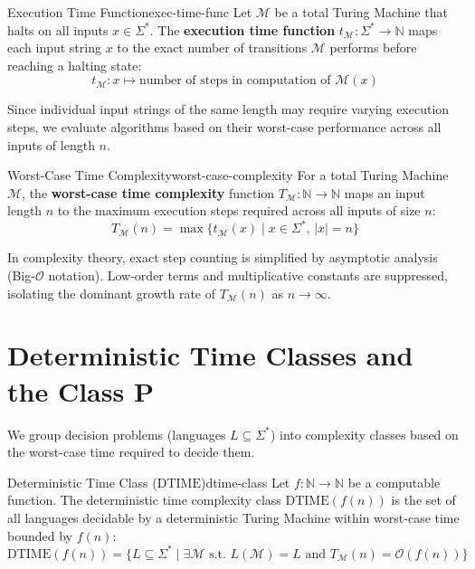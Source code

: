 \begin{definition}{Execution Time Function}{exec-time-func}
Let $\mathcal{M}$ be a total Turing Machine that halts on all inputs $x \in \Sigma^*$. The \textbf{execution time function} $t_{\mathcal{M}} : \Sigma^* \to \mathbb{N}$ maps each input string $x$ to the exact number of transitions $\mathcal{M}$ performs before reaching a halting state:
\[
t_{\mathcal{M}} : x \mapsto \text{number of steps in computation of } \mathcal{M}(x)
\]
\end{definition}

Since individual input strings of the same length may require varying execution steps, we evaluate algorithms based on their worst-case performance across all inputs of length $n$.

\begin{definition}{Worst-Case Time Complexity}{worst-case-complexity}
For a total Turing Machine $\mathcal{M}$, the \textbf{worst-case time complexity} function $T_{\mathcal{M}} : \mathbb{N} \to \mathbb{N}$ maps an input length $n$ to the maximum execution steps required across all inputs of size $n$:
\[
T_{\mathcal{M}}(n) = \max \{ t_{\mathcal{M}}(x) \mid x \in \Sigma^*, \, |x| = n \}
\]
\end{definition}

In complexity theory, exact step counting is simplified by asymptotic analysis (Big-$\mathcal{O}$ notation). Low-order terms and multiplicative constants are suppressed, isolating the dominant growth rate of $T_{\mathcal{M}}(n)$ as $n \to \infty$.

\section{Deterministic Time Classes and the Class P}

We group decision problems (languages $L \subseteq \Sigma^*$) into complexity classes based on the worst-case time required to decide them.

\begin{definition}{Deterministic Time Class ($\text{DTIME}$)}{dtime-class}
Let $f : \mathbb{N} \to \mathbb{N}$ be a computable function. The deterministic time complexity class $\text{DTIME}(f(n))$ is the set of all languages decidable by a deterministic Turing Machine within worst-case time bounded by $f(n)$:
\[
\text{DTIME}(f(n)) = \{ L \subseteq \Sigma^* \mid \exists \mathcal{M} \text{ s.t. } L(\mathcal{M}) = L \text{ and } T_{\mathcal{M}}(n) = \mathcal{O}(f(n)) \}
\]
\end{definition}

